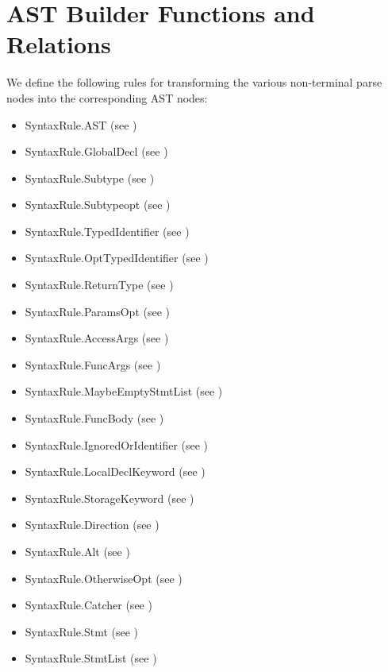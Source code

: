 \documentclass{book}
\begin{document}
\section{AST Builder Functions and Relations}
We define the following rules for transforming the various non-terminal parse nodes into
the corresponding AST nodes:
\begin{itemize}
  \item SyntaxRule.AST (see )
  \item SyntaxRule.GlobalDecl (see )
  \item SyntaxRule.Subtype (see )
  \item SyntaxRule.Subtypeopt (see )
  \item SyntaxRule.TypedIdentifier (see )
  \item SyntaxRule.OptTypedIdentifier (see )
  \item SyntaxRule.ReturnType (see )
  \item SyntaxRule.ParamsOpt (see )
  \item SyntaxRule.AccessArgs (see )
  \item SyntaxRule.FuncArgs (see )
  \item SyntaxRule.MaybeEmptyStmtList (see )
  \item SyntaxRule.FuncBody (see )
  \item SyntaxRule.IgnoredOrIdentifier (see )
  \item SyntaxRule.LocalDeclKeyword (see )
  \item SyntaxRule.StorageKeyword (see )
  \item SyntaxRule.Direction (see )
  \item SyntaxRule.Alt (see )
  \item SyntaxRule.OtherwiseOpt (see )
  \item SyntaxRule.Catcher (see )
  \item SyntaxRule.Stmt (see )
  \item SyntaxRule.StmtList (see )

\end{itemize}
\end{document}
